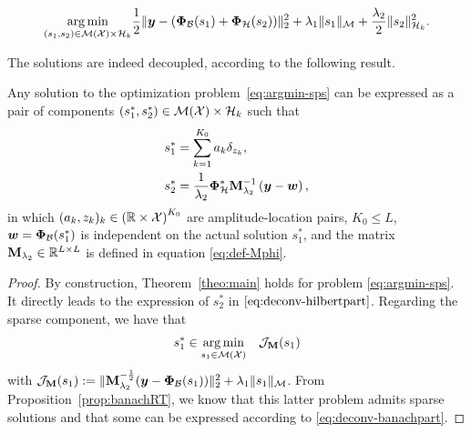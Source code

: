 \documentclass[12pt]{article}
\begin{document}
        \begin{equation}
        \label{eq:argmin-sps}
            \underset{(s_1,s_2) \in {\mathcal{M}}({\mathcal{X}}) \times \mathcal{H}_k}{\arg\min} \frac{1}{2} \| \bm{y} - (\bm{\Phi}_\mathcal{B} (s_1) + \bm{\Phi}_\mathcal{H} (s_2)) \|_2^2  + \lambda_{1} \| s_1 \|_{\mathcal{M}} + \frac{\lambda_{2}}{2} \| s_2 \|_{\mathcal{H}_k}^2.
        \end{equation}

        The solutions are indeed decoupled, according to the following result.
        \begin{proposition}
            \label{prop:rt-applied}
            Any solution to the optimization problem~\eqref{eq:argmin-sps} can be expressed as a pair of components $(s_1^*, s_2^*) \in {\mathcal{M}}({\mathcal{X}}) \times \mathcal{H}_k$ such that
            \begin{align}
                s_1^* &= \sum_{k=1}^{K_0} a_k \delta_{z_k}, \label{eq:deconv-banachpart}\\
                s_2^* &=  \frac{1}{\lambda_{2}}\bm{\Phi}_\mathcal{H}^* \mathbf{M}_{\lambda_{2}}^{-1} \left(\bm{y} - \bm{w}\right),\label{eq:deconv-hilbertpart}
            \end{align}
            in which $(a_k, z_k)_k \in \left(\mathbb{R} \times \mathcal{X}\right)^{K_0} $ are amplitude-location pairs, $K_0 \leq L$, $\bm{w} = \bm{\Phi}_\mathcal{B}(s_1^*)$ is independent on the actual solution $s_1^*$, and the matrix $\mathbf{M}_{\lambda_2} \in \mathbb{R}^{L \times L}$ is defined in equation \eqref{eq:def-Mphi}.
        \end{proposition}

        \begin{proof}
            By construction, Theorem~\ref{theo:main} holds for problem \eqref{eq:argmin-sps}. It directly leads to the expression of $s_2^*$ in $\eqref{eq:deconv-hilbertpart}$. Regarding the sparse component, we have that
            \begin{equation*}
                s_1^* \in \underset{ s_1\in{\mathcal{M}}({\mathcal{X}})}{\arg\min} \quad  \mathcal{J}_{\mathbf{M}}(s_1)
            \end{equation*}
            with $\mathcal{J}_{\mathbf{M}}(s_1) := \|\mathbf{M}_{\lambda_{2}}^{-\frac{1}{2}} ( \bm{y} - \bm{\Phi}_\mathcal{B}(s_1)  ) \|_2^2  + \lambda_{1} \| s_1 \|_{\mathcal{M}}$. From Proposition~\ref{prop:banachRT}, we know that this latter problem admits sparse solutions and that some can be expressed according to \eqref{eq:deconv-banachpart}.
        \end{proof}
\end{document}
